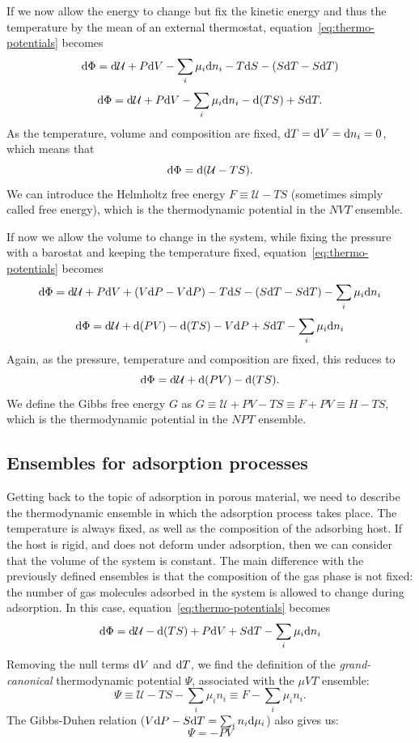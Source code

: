 \documentclass[thesis]{subfiles}
\begin{document}
If we now allow the energy to change but fix the kinetic energy and thus the
temperature by the mean of an external thermostat,
equation~\eqref{eq:thermo-potentials} becomes
\[\text{d} \Phi = \text{d} \mathcal{U} + P \text{d} V - \sum_i \mu_i \text{d} n_i - T \text{d} S - (S \text{d} T - S \text{d} T) \]
\[\text{d} \Phi = \text{d} \mathcal{U} + P \text{d} V - \sum_i \mu_i \text{d} n_i - \text{d} (TS) + S \text{d} T. \]
As the temperature, volume and composition are fixed, $\text{d} T = \text{d} V = \text{d} n_i = 0$,
which means that
\[\text{d} \Phi = \text{d} (\mathcal{U} - TS).\]
We can introduce the Helmholtz free energy $F \equiv \mathcal{U} - TS$
(sometimes simply called free energy), which is the thermodynamic potential in
the $NVT$ ensemble.

If now we allow the volume to change in the system, while fixing the pressure
with a barostat and keeping the temperature fixed,
equation~\eqref{eq:thermo-potentials} becomes
\[\text{d} \Phi = \text{d} \mathcal{U} + P \text{d} V + (V\text{d} P - V\text{d} P) - T \text{d} S - (S\text{d} T - S\text{d} T) - \sum_i \mu_i \text{d} n_i\]
\[\text{d} \Phi = \text{d} \mathcal{U} + \text{d} (PV) - \text{d}(TS) - V\text{d} P + S\text{d} T - \sum_i \mu_i \text{d} n_i\]
Again, as the pressure, temperature and composition are fixed, this reduces to
\[\text{d} \Phi = \text{d} \mathcal{U} + \text{d} (PV) - \text{d}(TS).\]
We define the Gibbs free energy $G$ as $G \equiv \mathcal{U} + PV - TS \equiv F + PV
\equiv H - TS$, which is the thermodynamic potential in the $NPT$ ensemble.

\subsection{Ensembles for adsorption processes}
\label{sec:osmotic-ensemble}

Getting back to the topic of adsorption in porous material, we need to describe
the thermodynamic ensemble in which the adsorption process takes place. The
temperature is always fixed, as well as the composition of the adsorbing host.
If the host is rigid, and does not deform under adsorption, then we can consider
that the volume of the system is constant. The main difference with the
previously defined ensembles is that the composition of the gas phase is not
fixed: the number of gas molecules adsorbed in the system is allowed to change
during adsorption. In this case, equation~\eqref{eq:thermo-potentials} becomes
\[\text{d} \Phi = \text{d} \mathcal{U} - \text{d}(TS) + P\text{d} V + S\text{d} T - \sum_i \mu_i \text{d} n_i\]
Removing the null terms $\text{d} V$ and $\text{d} T$, we find the definition of the
\emph{grand-canonical} thermodynamic potential $\Psi$, associated with the
$\mu VT$ ensemble:
\[\Psi \equiv \mathcal{U} - TS - \sum_i \mu_i n_i \equiv F - \sum_i \mu_i n_i.\]
The Gibbs-Duhen relation ($V\text{d} P - S\text{d} T = \sum_i n_i \text{d}\mu_i$) also gives us:
\[\Psi = -PV \]
\end{document}
